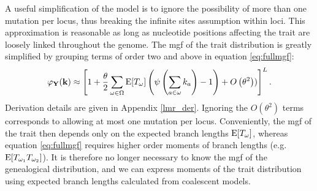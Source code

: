 A useful simplification of the model is to ignore the possibility of more than
one mutation per locus, thus breaking the infinite sites assumption within loci.
This approximation is reasonable as long as nucleotide positions affecting the
trait are loosely linked throughout the genome. The mgf of the trait
distribution is greatly simplified by grouping terms of order two and above in
equation
\eqref{eq:fullmgf}:
\begin{equation}
\label{eq:lowmut}
\varphi_{\mathbf{Y}}(\mathbf{k}) \approx \left[ 1 + \frac{\theta}{2} \sum_{\omega \in \Omega}
  \mathrm{E}[T_\omega] \left( \psi\left( \sum_{a \in \omega} k_a\right) -1 \right) +
  O\left( \theta^2 \right))\right]^L.
\end{equation}
Derivation details are given in Appendix \ref{lmr_der}. Ignoring the
$O\left( \theta^2 \right)$ terms corresponds to allowing at most one mutation
per locus. Conveniently, the mgf of the trait then depends only on the expected
branch lengths $\mathrm{E}[T_{\omega}]$, whereas equation \eqref{eq:fullmgf} requires
higher order moments of branch lengths (e.g. $\mathrm{E}[T_{\omega_1}T_{\omega_2}]$). It
is therefore no longer necessary to know the mgf of the genealogical
distribution, and we can express moments of the trait distribution using
expected branch lengths calculated from coalescent models.

